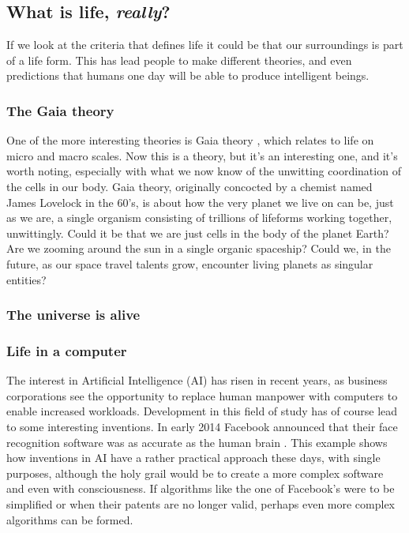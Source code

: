 \subsection*{What is life, \textit{really}?}

If we look at the criteria that defines life it could be that our surroundings is part of a life form.
This has lead people to make different theories, and even predictions that humans one day will be able to produce intelligent beings.

\subsubsection*{The Gaia theory}
One of the more interesting theories is Gaia theory \cite{Lovelock}, which relates to life on micro and macro scales. Now this is a theory, but it's an interesting one, and it's worth noting, especially with what we now know of the unwitting coordination of the cells in our body.
Gaia theory, originally concocted by a chemist named James Lovelock in the 60's, is about how the very planet we live on can be, just as we are, a single organism consisting of trillions of lifeforms working together, unwittingly.
Could it be that we are just cells in the body of the planet Earth?
Are we zooming around the sun in a single organic spaceship?
Could we, in the future, as our space travel talents grow, encounter living planets as singular entities?

\subsubsection*{The universe is alive}

\subsubsection*{Life in a computer}
The interest in Artificial Intelligence (AI) has risen in recent years, as business corporations see the opportunity to replace human manpower with computers to enable increased workloads.
Development in this field of study has of course lead to some interesting inventions.
In early 2014 Facebook announced that their face recognition software was as accurate as the human brain \cite{facebook}.
This example shows how inventions in AI have a rather practical approach these days, with single purposes, although the holy grail would be to create a more complex software and even with consciousness.
If algorithms like the one of Facebook's were to be simplified or when their patents are no longer valid, perhaps even more complex algorithms can be formed.

